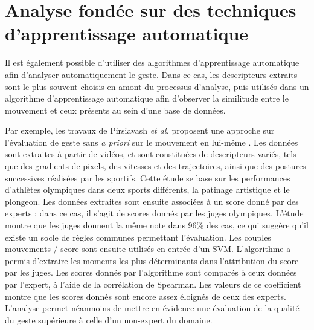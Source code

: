 \section{Analyse fondée sur des techniques d'apprentissage automatique}
Il est également possible d'utiliser des algorithmes d'apprentissage automatique afin d'analyser automatiquement le geste. Dans ce cas, les descripteurs extraits sont le plus souvent choisis en amont du processus d'analyse, puis utilisés dans un algorithme d'apprentissage automatique afin d'observer la similitude entre le mouvement et ceux présents au sein d'une base de données.

Par exemple, les travaux de Pirsiavash \textit{et al.} proposent une approche sur l'évaluation de geste sans \textit{a priori} sur le mouvement en lui-même \parencite{Pirsiavash2014AQA}. Les données sont extraites à partir de vidéos, et sont constituées de descripteurs variés, tels que des gradients de pixels, des vitesses et des trajectoires, ainsi que des postures successives réalisées par les sportifs. Cette étude se base sur les performances d'athlètes olympiques dans deux sports différents, la patinage artistique et le plongeon. Les données extraites sont ensuite associées à un score donné par des experts ; dans ce cas, il s'agit de scores donnés par les juges olympiques. L'étude montre que les juges donnent la même note dans 96\% des cas, ce qui suggère qu'il existe un socle de règles communes permettant l'évaluation. Les couples mouvements / score sont ensuite utilisés en entrée d'un SVM. L'algorithme a permis d'extraire les moments les plus déterminants dans l'attribution du score par les juges. Les scores donnés par l'algorithme sont comparés à ceux données par l'expert, à l'aide de la corrélation de Spearman. Les valeurs de ce coefficient montre que les scores donnés sont encore assez éloignés de ceux des experts. L'analyse permet néanmoins de mettre en évidence une évaluation de la qualité du geste supérieure à celle d'un non-expert du domaine.


